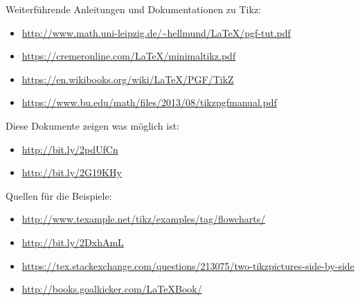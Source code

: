 \newpage
Weiterführende Anleitungen und Dokumentationen zu Tikz:
\begin{itemize}
	\item \url{http://www.math.uni-leipzig.de/~hellmund/LaTeX/pgf-tut.pdf}
	\item \url{https://cremeronline.com/LaTeX/minimaltikz.pdf}
	\item \url{https://en.wikibooks.org/wiki/LaTeX/PGF/TikZ}
	\item \url{https://www.bu.edu/math/files/2013/08/tikzpgfmanual.pdf}
\end{itemize}

Diese Dokumente zeigen was möglich ist:
\begin{itemize}
	\item\url{http://bit.ly/2pdUfCn}
	\item  \url{http://bit.ly/2G19KHy}
\end{itemize}

Quellen für die Beispiele:
\begin{itemize}
	\item \url{http://www.texample.net/tikz/examples/tag/flowcharts/}
	\item \url{http://bit.ly/2DxhAmL}
	\item \url{https://tex.stackexchange.com/questions/213075/two-tikzpictures-side-by-side}
    \item \url{http://books.goalkicker.com/LaTeXBook/}
\end{itemize}

